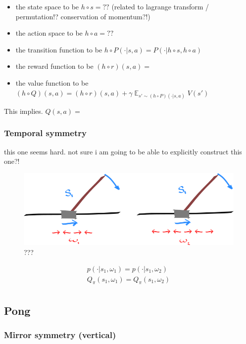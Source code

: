 \begin{itemize}
\tightlist
  \item the state space to be $h\circ s = ??$ (related to lagrange transform / permutation!? conservation of momentum?!)
  \item the action space to be $h\circ a = ??$
  \item the transition function to be $h\circ P(\cdot|s, a) = P(\cdot|h \circ s, h \circ a)$
  \item the reward function to be $(h \circ r)(s, a) = $
  \item the value function to be $(h\circ Q)(s, a) = (h \circ r)(s, a) + \gamma \mathop{\mathbb E}_{s' \sim (h\circ P)(\cdot|s, a)} V(s')$
\end{itemize}

This implies. $Q(s, a) = $


\subsubsection{Temporal symmetry}

{\color{red} this one seems hard. not sure i am going to be able to explicitly construct this one?!}


\begin{figure}[!h]
\centering
\includegraphics[width=1\textwidth,height=0.25\textheight]{../../pictures/drawings/cart-pole-temporal-approx.png}
\caption{???}
\end{figure}

\begin{align}
p(\cdot|s_1, \omega_1) = p(\cdot|s_1, \omega_2) \\
Q_{\pi}(s_1, \omega_1) = Q_{\pi}(s_1,\omega_2) \\
\end{align}


\subsection{Pong}

\subsubsection{Mirror symmetry (vertical)}


